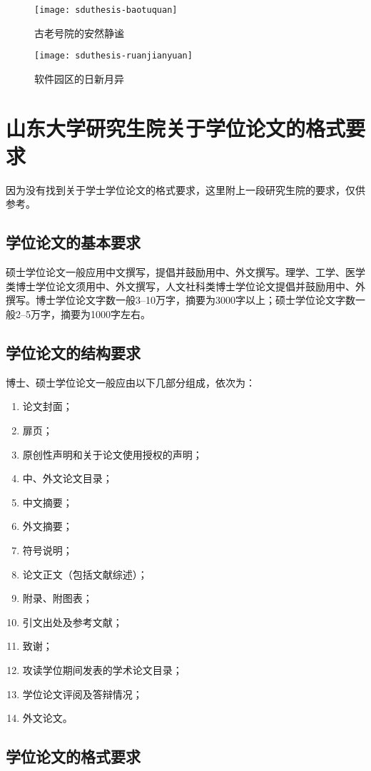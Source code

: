 \documentclass{sduthesis}
\begin{document}
\begin{figure}[!htb]
\centering
\begin{minipage}{0.5\linewidth}
\centering
\texttt{[image: sduthesis-baotuquan]}
\caption{古老号院的安然静谧}\label{fig:baotuquan}
\end{minipage}%
\begin{minipage}{0.5\linewidth}
\centering
\texttt{[image: sduthesis-ruanjianyuan]}
\caption{软件园区的日新月异}\label{fig:ruanjianyuan}
\end{minipage}
\end{figure}
\appendix
\chapter{山东大学研究生院关于学位论文的格式要求}
因为没有找到关于学士学位论文的格式要求，这里附上一段研究生院的要求，仅供参考。
\section{学位论文的基本要求}
硕士学位论文一般应用中文撰写，提倡并鼓励用中、外文撰写。理学、工学、医学类博士学位论文须用中、外文撰写，人文社科类博士学位论文提倡并鼓励用中、外撰写。博士学位论文字数一般3--10万字，摘要为3000字以上；硕士学位论文字数一般2--5万字，摘要为1000字左右。
\section{学位论文的结构要求}
博士、硕士学位论文一般应由以下几部分组成，依次为：
\begin{enumerate}
\item 论文封面；\item 扉页；\item 原创性声明和关于论文使用授权的声明；\item 中、外文论文目录；\item 中文摘要；\item 外文摘要；\item 符号说明；\item 论文正文（包括文献综述）；\item 附录、附图表；\item 引文出处及参考文献；\item 致谢；\item 攻读学位期间发表的学术论文目录；\item 学位论文评阅及答辩情况；\item 外文论文。
\end{enumerate}
\section{学位论文的格式要求}
\end{document}
